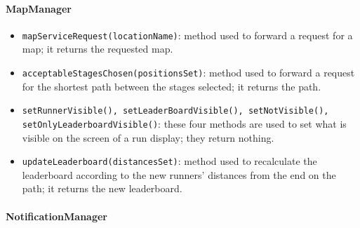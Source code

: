 \paragraph{MapManager}

\begin{itemize}
\item[ ]\texttt{mapServiceRequest(locationName)}: method used to forward a request for a map; it returns the requested map.

\item[ ]\texttt{acceptableStagesChosen(positionsSet)}: method used to forward a request for the shortest path between the stages selected; it returns the path.

\item[ ]\texttt{setRunnerVisible(), setLeaderBoardVisible(), setNotVisible(), setOnlyLeaderb\-oardVisible()}: these four methods are used to set what is visible on the screen of a run display; they return nothing.

\item[ ]\texttt{updateLeaderboard(distancesSet)}: method used to recalculate the leaderboard according to the new runners' distances from the end on the path; it returns the new leaderboard.
\end{itemize}
 
\paragraph{NotificationManager}

